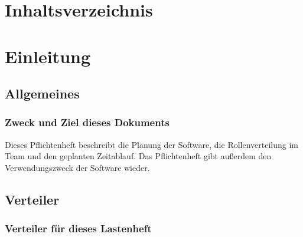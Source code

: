 \documentclass[12pt]{article}
\renewcommand{\_}{\kern-1.5pt\textunderscore\kern-1.5pt}
\begin{document}

\section*{Inhaltsverzeichnis}



\tableofcontents
{}


\vspace{\baselineskip}
\section*{Einleitung}
\subsection*{Allgemeines }
\subsubsection*{Zweck und Ziel dieses Dokuments}
Dieses Pflichtenheft beschreibt die Planung der Software, die Rollenverteilung im Team und den geplanten Zeitablauf. Das Pflichtenheft gibt außerdem den Verwendungszweck der Software wieder. 

\vspace{\baselineskip}
\subsection*{Verteiler}
\subsubsection*{Verteiler für dieses Lastenheft}


\end{document}
